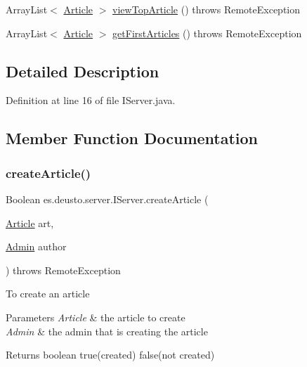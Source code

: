 \begin{DoxyCompactItemize}
\item 
Array\+List$<$ \hyperlink{classes_1_1deusto_1_1server_1_1jdo_1_1_article}{Article} $>$ \hyperlink{interfacees_1_1deusto_1_1server_1_1_i_server_ab1b33472017b55ae84bf849430db5f1b}{view\+Top\+Article} ()  throws Remote\+Exception
\item 
Array\+List$<$ \hyperlink{classes_1_1deusto_1_1server_1_1jdo_1_1_article}{Article} $>$ \hyperlink{interfacees_1_1deusto_1_1server_1_1_i_server_a27b2a5526387404d63d7fc6d0415acd4}{get\+First\+Articles} ()  throws Remote\+Exception
\end{DoxyCompactItemize}


\subsection{Detailed Description}


Definition at line 16 of file I\+Server.\+java.



\subsection{Member Function Documentation}
\mbox{\label{interfacees_1_1deusto_1_1server_1_1_i_server_a74b3203c5a8d94e91004df0dc84ca386}} 
\subsubsection{\texorpdfstring{create\+Article()}{createArticle()}}
{\footnotesize\ttfamily Boolean es.\+deusto.\+server.\+I\+Server.\+create\+Article (\begin{DoxyParamCaption}\item[{\hyperlink{classes_1_1deusto_1_1server_1_1jdo_1_1_article}{Article}}]{art,  }\item[{\hyperlink{classes_1_1deusto_1_1server_1_1jdo_1_1_admin}{Admin}}]{author }\end{DoxyParamCaption}) throws Remote\+Exception}

To create an article


\begin{DoxyParams}{Parameters}
{\em Article} & the article to create \\
\hline
{\em Admin} & the admin that is creating the article \\
\hline
\end{DoxyParams}
\begin{DoxyReturn}{Returns}
boolean true(created) false(not created) 
\end{DoxyReturn}


